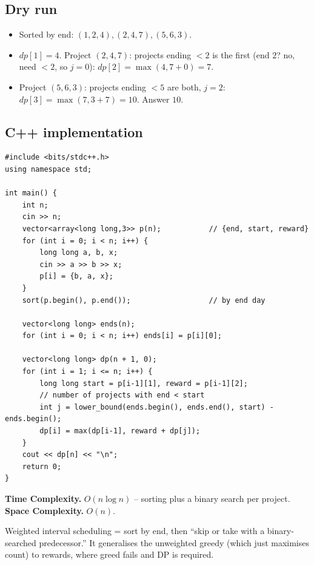 \subsection*{Dry run}


\begin{itemize}
  \item Sorted by end: $(1,2,4),(2,4,7),(5,6,3)$.
  \item $\textit{dp}[1]=4$. Project $(2,4,7)$: projects ending $<2$ is
        the first (end $2$? no, need $<2$, so $j=0$):
        $\textit{dp}[2]=\max(4,7+0)=7$.
  \item Project $(5,6,3)$: projects ending $<5$ are both, $j=2$:
        $\textit{dp}[3]=\max(7,3+7)=10$. Answer $10$.
\end{itemize}

\subsection*{C++ implementation}

\begin{lstlisting}
#include <bits/stdc++.h>
using namespace std;

int main() {
    int n;
    cin >> n;
    vector<array<long long,3>> p(n);           // {end, start, reward}
    for (int i = 0; i < n; i++) {
        long long a, b, x;
        cin >> a >> b >> x;
        p[i] = {b, a, x};
    }
    sort(p.begin(), p.end());                  // by end day

    vector<long long> ends(n);
    for (int i = 0; i < n; i++) ends[i] = p[i][0];

    vector<long long> dp(n + 1, 0);
    for (int i = 1; i <= n; i++) {
        long long start = p[i-1][1], reward = p[i-1][2];
        // number of projects with end < start
        int j = lower_bound(ends.begin(), ends.end(), start) - ends.begin();
        dp[i] = max(dp[i-1], reward + dp[j]);
    }
    cout << dp[n] << "\n";
    return 0;
}
\end{lstlisting}

\begin{complexitybox}
\textbf{Time Complexity.} $O(n\log n)$ -- sorting plus a binary search per
project. \textbf{Space Complexity.} $O(n)$.
\end{complexitybox}

\begin{takeawaybox}
Weighted interval scheduling = sort by end, then ``skip or take with a
binary-searched predecessor.'' It generalises the unweighted greedy
(which just maximises count) to rewards, where greed fails and DP is
required.
\end{takeawaybox}
